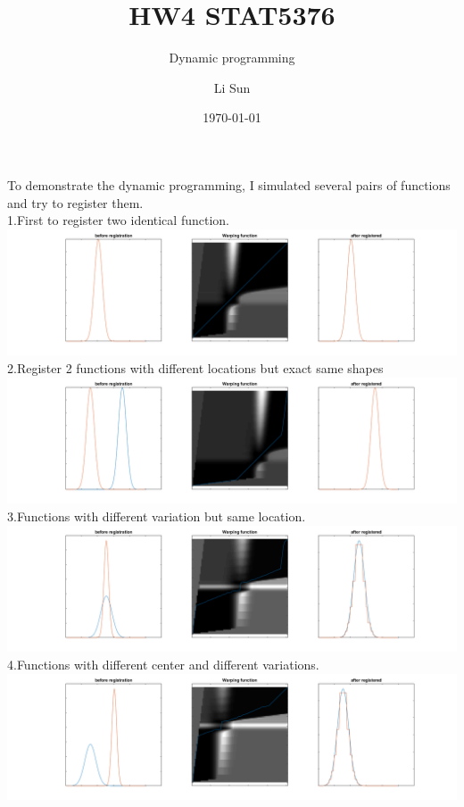 \documentclass[11pt]{scrartcl}
\begin{document}
\title{HW4 STAT5376}
\subtitle{Dynamic programming}
\author{Li Sun}
\date{\today}
\maketitle

\noindent
To demonstrate the dynamic programming, I simulated several pairs of functions and try to register them.\\
1.First to register two identical function.\\
\includegraphics[scale=0.4]{hw41.png}\\
2.Register 2 functions with different locations but exact same shapes\\
\includegraphics[scale=0.4]{hw42.png}\\
3.Functions with different variation but same location.\\
\includegraphics[scale=0.4]{hw43.png}\\
4.Functions with different center and different variations.\\
\includegraphics[scale=0.4]{hw44.png}\\
\end{document}
